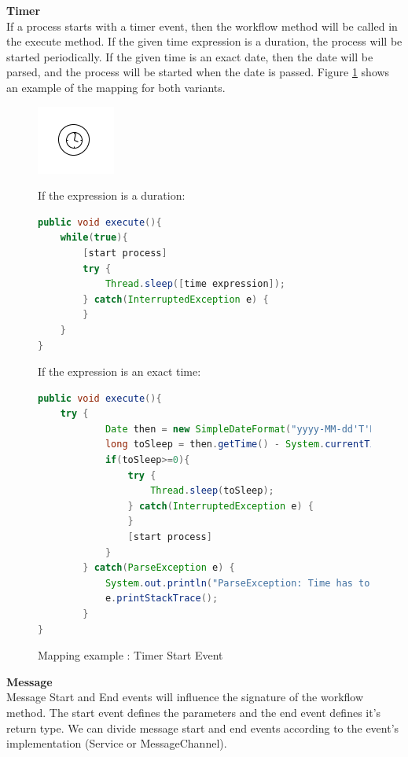 \textbf{Timer}\\
If a process starts with a timer event, then the workflow method will be called in the execute method. If the given time expression is a duration, the process will be started periodically. If the given time is an exact date, then the date will be parsed, and the process will be started when the date is passed. Figure \ref{fig:timer_start} shows an example of the mapping for both variants.

\begin{figure}[h]
\begin{minipage}[c]{0.28\textwidth}
\includegraphics{images/mapping/timer_start.png}
\end{minipage}
\begin{minipage}[c]{0.72\textwidth}
If the expression is a duration:
\begin{lstlisting}[language = Java]
public void execute(){
	while(true){
		[start process]
		try {
			Thread.sleep([time expression]);
		} catch(InterruptedException e) {
		}
	}
}
\end{lstlisting}
If the expression is an exact time:
\begin{lstlisting}[language = Java]
public void execute(){
	try {
			Date then = new SimpleDateFormat("yyyy-MM-dd'T'HH:mm:ss.SSSZ").parse("2011-11-04T10:00:00.000+0100");
			long toSleep = then.getTime() - System.currentTimeMillis();
			if(toSleep>=0){
				try {
					Thread.sleep(toSleep);
				} catch(InterruptedException e) {
				}
				[start process]
			}
		} catch(ParseException e) {
			System.out.println("ParseException: Time has to be in yyyy-MM-dd'T'HH:mm:ss.SSSZ form");
			e.printStackTrace();
		}
}
\end{lstlisting}
\end{minipage}
\caption{Mapping example : Timer Start Event}%
\label{fig:timer_start}%
\end{figure}
\newpage

\textbf{Message}\\
Message Start and End events will influence the signature of the workflow method. The start event defines the parameters and the end event defines it's return type. We can divide message start and end events according to the event's implementation (Service or MessageChannel). 

